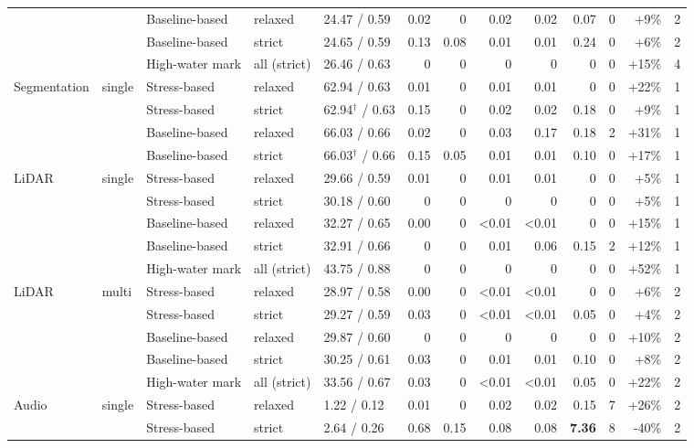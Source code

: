 \begin{longtable}{lllllrrrrrrrr}
 &  & Baseline-based & relaxed & 24.47 / 0.59 & 0.02 & 0 & 0.02 & 0.02 & 0.07 & 0 & +9\% & 2 \\
 &  & Baseline-based & strict & 24.65 / 0.59 & 0.13 & 0.08 & 0.01 & 0.01 & 0.24 & 0 & +6\% & 2 \\
 &  & High-water mark & all (strict) & 26.46 / 0.63 & 0 & 0 & 0 & 0 & 0 & 0 & +15\% & 4 \\
\midrule
Segmentation & single & Stress-based & relaxed & 62.94 / 0.63 & 0.01 & 0 & 0.01 & 0.01 & 0 & 0 & +22\% & 1 \\
 &  & Stress-based & strict & 62.94$^\dagger$ / 0.63 & 0.15 & 0 & 0.02 & 0.02 & 0.18 & 0 & +9\% & 1 \\
 &  & Baseline-based & relaxed & 66.03 / 0.66 & 0.02 & 0 & 0.03 & 0.17 & 0.18 & 2 & +31\% & 1 \\
 &  & Baseline-based & strict & 66.03$^\dagger$ / 0.66 & 0.15 & 0.05 & 0.01 & 0.01 & 0.10 & 0 & +17\% & 1 \\
\midrule
LiDAR & single & Stress-based & relaxed & 29.66 / 0.59 & 0.01 & 0 & 0.01 & 0.01 & 0 & 0 & +5\% & 1 \\
 &  & Stress-based & strict & 30.18 / 0.60 & 0 & 0 & 0 & 0 & 0 & 0 & +5\% & 1 \\
 &  & Baseline-based & relaxed & 32.27 / 0.65 & 0.00 & 0 & <0.01 & <0.01 & 0 & 0 & +15\% & 1 \\
 &  & Baseline-based & strict & 32.91 / 0.66 & 0 & 0 & 0.01 & 0.06 & 0.15 & 2 & +12\% & 1 \\
 &  & High-water mark & all (strict) & 43.75 / 0.88 & 0 & 0 & 0 & 0 & 0 & 0 & +52\% & 1 \\
\midrule
LiDAR & multi & Stress-based & relaxed & 28.97 / 0.58 & 0.00 & 0 & <0.01 & <0.01 & 0 & 0 & +6\% & 2 \\
 &  & Stress-based & strict & 29.27 / 0.59 & 0.03 & 0 & <0.01 & <0.01 & 0.05 & 0 & +4\% & 2 \\
 &  & Baseline-based & relaxed & 29.87 / 0.60 & 0 & 0 & 0 & 0 & 0 & 0 & +10\% & 2 \\
 &  & Baseline-based & strict & 30.25 / 0.61 & 0.03 & 0 & 0.01 & 0.01 & 0.10 & 0 & +8\% & 2 \\
 &  & High-water mark & all (strict) & 33.56 / 0.67 & 0.03 & 0 & <0.01 & <0.01 & 0.05 & 0 & +22\% & 2 \\
\midrule
Audio & single & Stress-based & relaxed & 1.22 / 0.12 & 0.01 & 0 & 0.02 & 0.02 & 0.15 & 7 & +26\% & 2 \\
 &  & Stress-based & strict & 2.64 / 0.26 & 0.68 & 0.15 & 0.08 & 0.08 & \textbf{7.36} & 8 & -40\% & 2 \\

\end{longtable}
